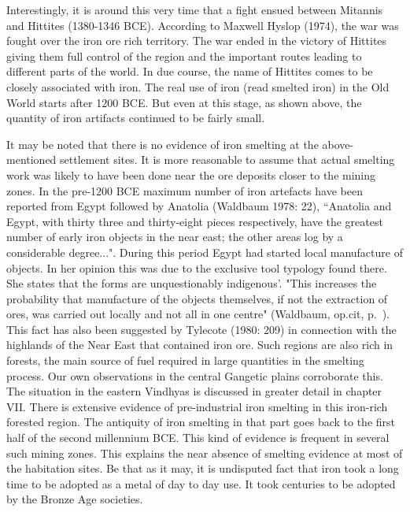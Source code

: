 {Interestingly, it is around this very time that a fight ensued between Mitannis and Hittites (1380-1346 BCE). According to Maxwell Hyslop (1974), the war was fought over the iron ore rich territory. The war ended in the victory of Hittites giving them full control of the region and the important routes leading to different parts of the world. In due course, the name of Hittites comes to be closely associated with iron. The real use of iron (read smelted iron) in the Old World starts after 1200 BCE. But even at this stage, as shown above, the quantity of iron artifacts continued to be fairly small. 

It may be noted that there is no evidence of iron smelting at the above-mentioned settlement sites. It is more reasonable to assume that actual smelting work was likely to have been done near the ore deposits closer to the mining zones. In the pre-1200 BCE maximum number of iron artefacts have been reported from Egypt followed by Anatolia (Waldbaum 1978: 22), {\footnotesize ``Anatolia and Egypt, with thirty three and thirty-eight pieces respectively, have the greatest number of early iron objects in the near east; the other areas log by a considerable degree...".} During this period Egypt had started local manufacture of objects. In her opinion this was due to the exclusive tool typology found there. She states that the forms are unquestionably indigenous'. "This increases the probability that manufacture of the objects themselves, if not the extraction of ores, was carried out locally and not all in one centre" (Waldbaum, op.cit, p.~\pageref{pageno23}). This fact has also been suggested by Tylecote (1980: 209) in connection with the highlands of the Near East that contained iron ore. Such regions are also rich in forests, the main source of fuel required in large quantities in the smelting process. Our own observations in the central Gangetic plains corroborate this. The situation in the eastern Vindhyas is discussed in greater detail in chapter VII. There is extensive evidence of pre-industrial iron smelting in this iron-rich forested region. The antiquity of iron smelting in that part goes back to the first half of the second millennium BCE. This kind of evidence is frequent in several such mining zones. This explains the near absence of smelting evidence at most of the habitation sites. Be that as it may, it is undisputed fact that iron took a long time to be adopted as a metal of day to day use. It took centuries to be adopted by the Bronze Age societies. 

}
